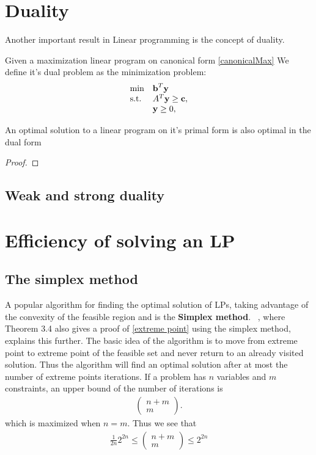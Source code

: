 \section{Duality}
Another important result in Linear programming is the concept of duality.
\begin{definition}
Given a maximization linear program on canonical form \ref{canonicalMax}
We define it's dual problem as the minimization problem:
\begin{align}\label{canonicalMaxDual}
\begin{array}{ll@{}ll}
\text{min} &\textbf{b}^T\textbf{y}&\\
\text{s.t.} &A^T\textbf{y} \geq \textbf{c},&\\
&\textbf{y} \geq 0,&\\
\end{array}
\end{align}
\end{definition}
\begin{theorem}
An optimal solution to a linear program on it's primal form is also optimal in the dual form
\begin{proof}
\end{proof}
\end{theorem}
\subsection{Weak and strong duality}
\section{Efficiency of solving an LP}
\subsection{The simplex method}
A popular algorithm for finding the optimal solution of LPs, taking advantage of the convexity of the feasible region and  is the \textbf{Simplex method}. ~\cite{vanderbei2015linear}, where Theorem 3.4 also gives a proof of \ref{extreme point} using the simplex method, explains this further. The basic idea of the algorithm is to move from extreme point to extreme point of the feasible set and never return to an already visited solution. Thus the algorithm will find an optimal solution after at most the number of extreme points iterations. If a problem has $n$ variables and $m$ constraints, an upper bound of the number of iterations is 
\begin{align*}
\begin{pmatrix}
n+m\\m
\end{pmatrix}.
\end{align*} 
which is maximized when $n=m$. Thus we see that 
\begin{align*}
\frac{1}{2n}2^{2n}\leq\begin{pmatrix}
n+m\\m
\end{pmatrix}\leq 2^{2n}
\end{align*}
